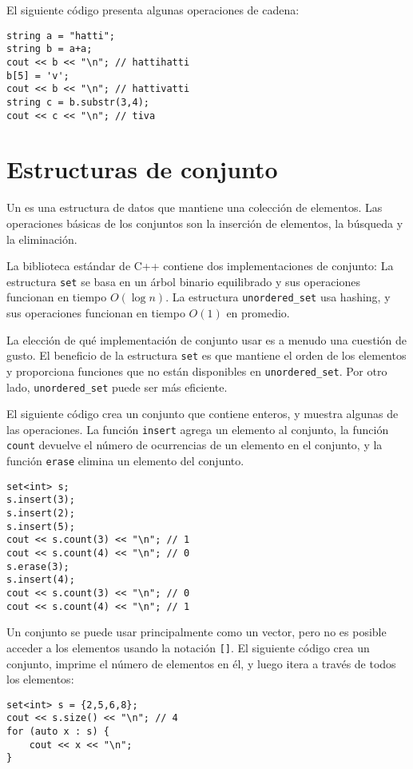 El siguiente código presenta algunas operaciones de cadena:

\begin{lstlisting}
string a = "hatti";
string b = a+a;
cout << b << "\n"; // hattihatti
b[5] = 'v';
cout << b << "\n"; // hattivatti
string c = b.substr(3,4);
cout << c << "\n"; // tiva
\end{lstlisting}

\section{Estructuras de conjunto}


Un  es una estructura de datos que
mantiene una colección de elementos.
Las operaciones básicas de los conjuntos son la inserción de elementos, la búsqueda y la eliminación.

La biblioteca estándar de C++ contiene dos implementaciones de conjunto:
La estructura \texttt{set} se basa en un árbol binario equilibrado
y sus operaciones funcionan en tiempo $O(\log n)$.
La estructura \texttt{unordered\_set} usa hashing,
y sus operaciones funcionan en tiempo $O(1)$ en promedio.

La elección de qué implementación de conjunto usar
es a menudo una cuestión de gusto.
El beneficio de la estructura \texttt{set}
es que mantiene el orden de los elementos
y proporciona funciones que no están disponibles
en \texttt{unordered\_set}.
Por otro lado, \texttt{unordered\_set}
puede ser más eficiente.

El siguiente código crea un conjunto
que contiene enteros,
y muestra algunas de las operaciones.
La función \texttt{insert} agrega un elemento al conjunto,
la función \texttt{count} devuelve el número de ocurrencias
de un elemento en el conjunto,
y la función \texttt{erase} elimina un elemento del conjunto.

\begin{lstlisting}
set<int> s;
s.insert(3);
s.insert(2);
s.insert(5);
cout << s.count(3) << "\n"; // 1
cout << s.count(4) << "\n"; // 0
s.erase(3);
s.insert(4);
cout << s.count(3) << "\n"; // 0
cout << s.count(4) << "\n"; // 1
\end{lstlisting}


Un conjunto se puede usar principalmente como un vector,
pero no es posible acceder
a los elementos usando la notación \texttt{[]}.
El siguiente código crea un conjunto,
imprime el número de elementos en él, y luego
itera a través de todos los elementos:
\begin{lstlisting}
set<int> s = {2,5,6,8};
cout << s.size() << "\n"; // 4
for (auto x : s) {
    cout << x << "\n";
}
\end{lstlisting}

